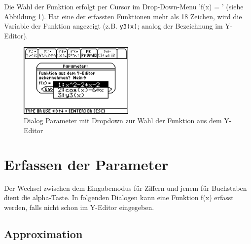 \documentclass[a4paper,10pt]{scrreprt}
\begin{document}
Die Wahl der Funktion erfolgt per Cursor im Drop-Down-Menu 'f(x) = ’ (siehe Abbildung \ref{fig:ParameterFxWahl}). Hat eine der erfassten Funktionen mehr als 18 Zeichen, wird die Variable der Funktion angezeigt (z.B. \verb|y3(x)|; analog der Bezeichnung im Y\hbox{-}Editor).
\begin{figure}[h]
  \centering
  \includegraphics[width=0.5\textwidth]{img/nummeth_image016.png}
  \caption{Dialog Parameter mit Dropdown zur Wahl der Funktion aus dem Y\hbox{-}Editor}
  \label{fig:ParameterFxWahl}
\end{figure}

\newpage
\section{Erfassen der Parameter}
Der Wechsel zwischen dem Eingabemodus f\"ur Ziffern und jenem f\"ur Buchstaben dient die alpha-Taste. In folgenden Dialogen kann eine Funktion f(x) erfasst werden, falls nicht schon im Y\hbox{-}Editor eingegeben.

\subsection{Approximation}
\end{document}

